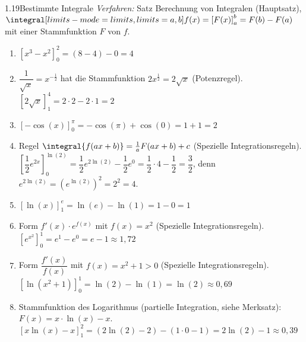 \begin{loesung}{1.19}{Bestimmte Integrale}
\textit{Verfahren:} Satz \glqq Berechnung von Integralen\grqq{} (Hauptsatz), $\integral[limits-mode=limits,limits={a, b}]{f(x)} = \left[F(x)\right]_a^b = F(b)-F(a)$ mit einer Stammfunktion $F$ von $f$.
\begin{enumerate}[label=\alph*)]
  \item $\left[x^3-x^2\right]_0^2 = (8-4)-0 = 4$
  \item $\dfrac{1}{\sqrt{x}} = x^{-\frac{1}{2}}$ hat die Stammfunktion $2x^{\frac{1}{2}} = 2\sqrt{x}$ (Potenzregel).\\
  $\left[2\sqrt{x}\right]_1^4 = 2\cdot 2-2\cdot 1 = 2$
  \item $\left[-\cos{(x)}\right]_0^{\pi} = -\cos{(\pi)}+\cos{(0)} = 1+1 = 2$
  \item Regel $\integral{f(ax+b)} = \frac{1}{a}F(ax+b)+c$ (Spezielle Integrationsregeln).\\
  $\left[\dfrac{1}{2}e^{2x}\right]_0^{\ln{(2)}} = \dfrac{1}{2}e^{2\ln{(2)}}-\dfrac{1}{2}e^0 = \dfrac{1}{2}\cdot 4-\dfrac{1}{2} = \dfrac{3}{2}$, denn $e^{2\ln{(2)}} = \left(e^{\ln{(2)}}\right)^2 = 2^2 = 4$.
  \item $\left[\ln{(x)}\right]_1^e = \ln{(e)}-\ln{(1)} = 1-0 = 1$
  \item Form $f'(x)\cdot e^{f(x)}$ mit $f(x)=x^2$ (Spezielle Integrationsregeln).\\
  $\left[e^{x^2}\right]_0^1 = e^1-e^0 = e-1\approx 1{,}72$
  \item Form $\dfrac{f'(x)}{f(x)}$ mit $f(x)=x^2+1>0$ (Spezielle Integrationsregeln).\\
  $\left[\ln{(x^2+1)}\right]_0^1 = \ln{(2)}-\ln{(1)} = \ln{(2)}\approx 0{,}69$
  \item Stammfunktion des Logarithmus (partielle Integration, siehe Merksatz): $F(x) = x\cdot\ln{(x)}-x$.\\
  $\left[x\ln{(x)}-x\right]_1^2 = (2\ln{(2)}-2)-(1\cdot 0-1) = 2\ln{(2)}-1\approx 0{,}39$
\end{enumerate}
\end{loesung}

